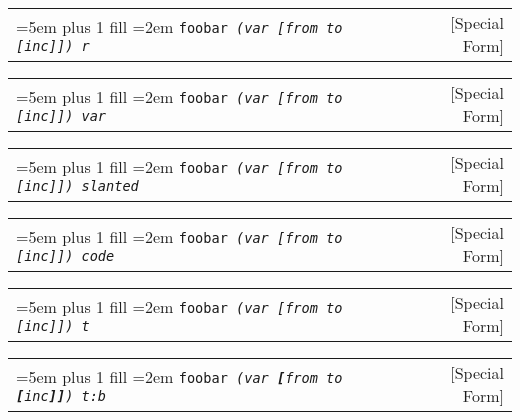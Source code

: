 \documentclass{book}
\newcommand\GNUTexinfocommandstyletextvar[1]{{\normalfont{}\textsl{#1}}}%
\begin{document}
%

\noindent\begin{tabularx}{\linewidth}{@{}Xr}
\rightskip=5em plus 1 fill
\hangindent=2em
\texttt{foobar \EmbracOn{}\textnormal{\textsl{(var \EmbracOff{}\textnormal{[}\EmbracOn{}from to \EmbracOff{}\textnormal{[}\EmbracOn{}inc\EmbracOff{}\textnormal{]]}\EmbracOn{}) r}}\EmbracOff{}}& [Special Form]
\end{tabularx}

%

\noindent\begin{tabularx}{\linewidth}{@{}Xr}
\rightskip=5em plus 1 fill
\hangindent=2em
\texttt{foobar \EmbracOn{}\textnormal{\textsl{(var \GNUTexinfocommandstyletextvar{[}from to \GNUTexinfocommandstyletextvar{[}inc\GNUTexinfocommandstyletextvar{]]}) var}}\EmbracOff{}}& [Special Form]
\end{tabularx}

%

\noindent\begin{tabularx}{\linewidth}{@{}Xr}
\rightskip=5em plus 1 fill
\hangindent=2em
\texttt{foobar \EmbracOn{}\textnormal{\textsl{(var \textsl{[}from to \textsl{[}inc\textsl{]]}) slanted}}\EmbracOff{}}& [Special Form]
\end{tabularx}

%

\noindent\begin{tabularx}{\linewidth}{@{}Xr}
\rightskip=5em plus 1 fill
\hangindent=2em
\texttt{foobar \EmbracOn{}\textnormal{\textsl{(var \texttt{[}from to \texttt{[}inc\texttt{]]}) code}}\EmbracOff{}}& [Special Form]
\end{tabularx}

%

\noindent\begin{tabularx}{\linewidth}{@{}Xr}
\rightskip=5em plus 1 fill
\hangindent=2em
\texttt{foobar \EmbracOn{}\textnormal{\textsl{(var \texttt{[}from to \texttt{[}inc\texttt{]]}) t}}\EmbracOff{}}& [Special Form]
\end{tabularx}

%

\noindent\begin{tabularx}{\linewidth}{@{}Xr}
\rightskip=5em plus 1 fill
\hangindent=2em
\texttt{foobar \EmbracOn{}\textnormal{\textsl{(var \texttt{\textbf{[}}from to \texttt{\textbf{[}}inc\texttt{\textbf{]]}}) t:b}}\EmbracOff{}}& [Special Form]
\end{tabularx}
\end{document}
